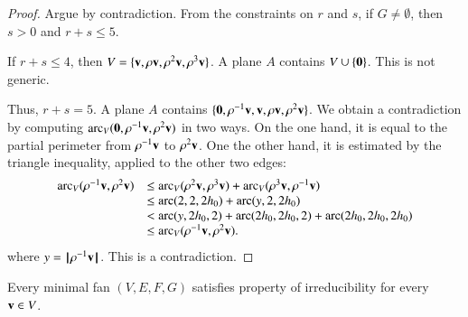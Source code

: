 \begin{proof}  Argue by contradiction.  From the constraints on $r$ and $s$, if $G\ne\emptyset$, then $s>0$ and $r+s\le 5$. 

If $r+s\le 4$, then $V = \{{\mathbf v},\rho {\mathbf v},\rho^2{\mathbf v},\rho^3{\mathbf v}\}$.  A plane $A$ contains $V\cup\{{\mathbf 0}\}$.   This is not generic.

Thus, $r+s=5$.  A plane $A$ contains $\{{\mathbf 0},\rho^{-1}{\mathbf v},{\mathbf v},\rho{\mathbf v},\rho^2{\mathbf v}\}$. 
We obtain a contradiction by computing $\operatorname{arc}_V({\mathbf 0},\rho^{-1}{\mathbf v},\rho^2{\mathbf v})$ in two ways.  On the one hand, it is equal to the partial perimeter from $\rho^{-1}{\mathbf v}$ to $\rho^2 {\mathbf v}$.  One the other hand,
it is estimated by the triangle inequality, applied to the other two edges:
$$
\begin{array}{lll}
\operatorname{arc}_V(\rho^{-1}{\mathbf v},\rho^2{\mathbf v})
&\le\operatorname{arc}_V(\rho^2{\mathbf v},\rho^3{\mathbf v}) + \operatorname{arc}_V(\rho^3{\mathbf v},\rho^{-1}{\mathbf v}) \\
&\le\operatorname{arc}(2,2,2{h_0})+\operatorname{arc}(y,2,2{h_0})\\
&<\operatorname{arc}(y,2{h_0},2)+\operatorname{arc}(2{h_0},2{h_0},2) +\operatorname{arc}(2{h_0},2{h_0},2{h_0})\\
&\le\operatorname{arc}_V(\rho^{-1}{\mathbf v},\rho^2{\mathbf v}).
\end{array}
$$
where $y={{\hskip0.1em|\hskip-0.15em|\hskip0.1em}\rho^{-1} {\mathbf v}{\hskip0.1em|\hskip-0.15em|\hskip0.1em}}$.
This is a contradiction.
\end{proof}

\begin{lemma}
Every minimal fan $(V,E,F,G)$ satisfies property  of irreducibility for
every ${\mathbf v}\in V$.
\end{lemma}

